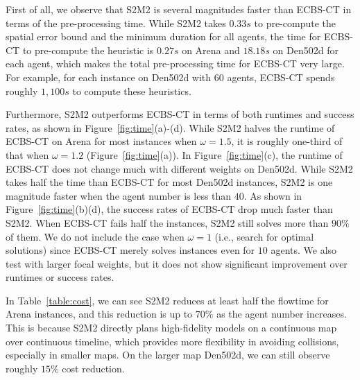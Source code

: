 \documentclass[letterpaper]{article} %
\theoremstyle{definition}
\begin{document}
First of all, we observe that S2M2 is several magnitudes faster than ECBS-CT in terms of the pre-processing time. While S2M2 takes $0.33s$ to pre-compute the spatial error bound and the minimum duration for all agents, the time for ECBS-CT to pre-compute the heuristic is $0.27s$ on Arena and $18.18s$ on Den502d for each agent, which makes the total pre-processing time for ECBS-CT very large. For example, for each instance on Den502d with 60 agents, ECBS-CT spends roughly $1,100s$ to compute these heuristics. 

Furthermore, S2M2 outperforms ECBS-CT in terms of both runtimes and success rates, %
as shown in Figure~\ref{fig:time}(a)-(d). While S2M2 halves the runtime of ECBS-CT on Arena for most instances when $\omega = 1.5$, it is roughly one-third of that when $\omega = 1.2$ (Figure~\ref{fig:time}(a)). In Figure~\ref{fig:time}(c), the runtime of ECBS-CT does not change much with different weights on Den502d. While S2M2 takes half the time than ECBS-CT for most Den502d instances, S2M2 is one magnitude faster when the agent number is less than $40$. As shown in Figure~\ref{fig:time}(b)(d), the success rates of ECBS-CT drop much faster than S2M2. When ECBS-CT fails half the instances, S2M2 still solves more than $90\%$ of them. We do not include the case when $\omega = 1$ (i.e., search for optimal solutions) since ECBS-CT merely solves instances even for $10$ agents. We also test with larger focal weights, but it does not show significant improvement over runtimes or success rates.

In Table~\ref{table:cost}, we can see S2M2 reduces at least half the flowtime for Arena instances, and this reduction is up to $70\%$ as the agent number increases. This is because S2M2 directly plans high-fidelity models on a continuous map over continuous timeline, which provides more flexibility in avoiding collisions, especially in smaller maps. On the larger map Den502d, we can still observe roughly $15\%$ cost reduction.  
\end{document}
